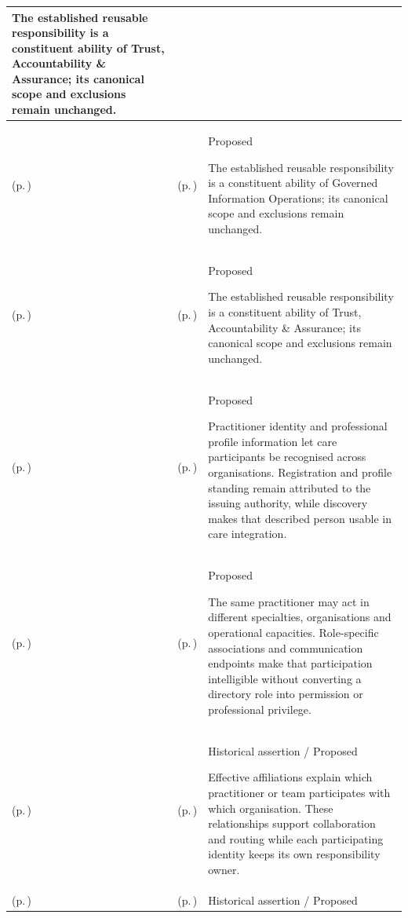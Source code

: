 \begin{longtable}{|>{\raggedright\arraybackslash}p{0.27\TableWidth}|>{\raggedright\arraybackslash}p{0.27\TableWidth}|>{\raggedright\arraybackslash}p{0.46\TableWidth}|}
The established reusable responsibility is a constituent ability of Trust, Accountability \& Assurance; its canonical scope and exclusions remain unchanged.\\\hline
\nameref{cap:ec-governed-information-operations} (p.\,\pageref{cap:ec-governed-information-operations}) & \nameref{cap:ec-13} (p.\,\pageref{cap:ec-13}) & Proposed

The established reusable responsibility is a constituent ability of Governed Information Operations; its canonical scope and exclusions remain unchanged.\\\hline
\nameref{cap:ec-trust-accountability-assurance} (p.\,\pageref{cap:ec-trust-accountability-assurance}) & \nameref{cap:ec-14} (p.\,\pageref{cap:ec-14}) & Proposed

The established reusable responsibility is a constituent ability of Trust, Accountability \& Assurance; its canonical scope and exclusions remain unchanged.\\\hline
\nameref{cap:bec-provider-administration} (p.\,\pageref{cap:bec-provider-administration}) & \nameref{cap:bec-practitioner} (p.\,\pageref{cap:bec-practitioner}) & Proposed

Practitioner identity and professional profile information let care participants be recognised across organisations. Registration and profile standing remain attributed to the issuing authority, while discovery makes that described person usable in care integration.\\\hline
\nameref{cap:bec-provider-administration} (p.\,\pageref{cap:bec-provider-administration}) & \nameref{cap:bec-practitioner-role} (p.\,\pageref{cap:bec-practitioner-role}) & Proposed

The same practitioner may act in different specialties, organisations and operational capacities. Role-specific associations and communication endpoints make that participation intelligible without converting a directory role into permission or professional privilege.\\\hline
\nameref{cap:bec-provider-administration} (p.\,\pageref{cap:bec-provider-administration}) & \nameref{cap:bec-provider-relationship} (p.\,\pageref{cap:bec-provider-relationship}) & Historical assertion / Proposed

Effective affiliations explain which practitioner or team participates with which organisation. These relationships support collaboration and routing while each participating identity keeps its own responsibility owner.\\\hline
\nameref{cap:bec-provider-administration} (p.\,\pageref{cap:bec-provider-administration}) & \nameref{cap:bec-provider-engagement} (p.\,\pageref{cap:bec-provider-engagement}) & Historical assertion / Proposed


\end{longtable}
